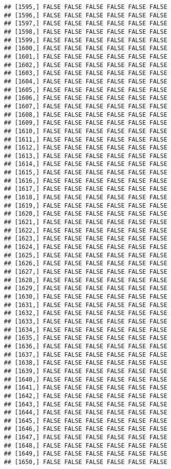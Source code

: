 \documentclass[
]{article}
\begin{document}
\begin{verbatim}
## [1595,] FALSE FALSE FALSE FALSE FALSE FALSE
## [1596,] FALSE FALSE FALSE FALSE FALSE FALSE
## [1597,] FALSE FALSE FALSE FALSE FALSE FALSE
## [1598,] FALSE FALSE FALSE FALSE FALSE FALSE
## [1599,] FALSE FALSE FALSE FALSE FALSE FALSE
## [1600,] FALSE FALSE FALSE FALSE FALSE FALSE
## [1601,] FALSE FALSE FALSE FALSE FALSE FALSE
## [1602,] FALSE FALSE FALSE FALSE FALSE FALSE
## [1603,] FALSE FALSE FALSE FALSE FALSE FALSE
## [1604,] FALSE FALSE FALSE FALSE FALSE FALSE
## [1605,] FALSE FALSE FALSE FALSE FALSE FALSE
## [1606,] FALSE FALSE FALSE FALSE FALSE FALSE
## [1607,] FALSE FALSE FALSE FALSE FALSE FALSE
## [1608,] FALSE FALSE FALSE FALSE FALSE FALSE
## [1609,] FALSE FALSE FALSE FALSE FALSE FALSE
## [1610,] FALSE FALSE FALSE FALSE FALSE FALSE
## [1611,] FALSE FALSE FALSE FALSE FALSE FALSE
## [1612,] FALSE FALSE FALSE FALSE FALSE FALSE
## [1613,] FALSE FALSE FALSE FALSE FALSE FALSE
## [1614,] FALSE FALSE FALSE FALSE FALSE FALSE
## [1615,] FALSE FALSE FALSE FALSE FALSE FALSE
## [1616,] FALSE FALSE FALSE FALSE FALSE FALSE
## [1617,] FALSE FALSE FALSE FALSE FALSE FALSE
## [1618,] FALSE FALSE FALSE FALSE FALSE FALSE
## [1619,] FALSE FALSE FALSE FALSE FALSE FALSE
## [1620,] FALSE FALSE FALSE FALSE FALSE FALSE
## [1621,] FALSE FALSE FALSE FALSE FALSE FALSE
## [1622,] FALSE FALSE FALSE FALSE FALSE FALSE
## [1623,] FALSE FALSE FALSE FALSE FALSE FALSE
## [1624,] FALSE FALSE FALSE FALSE FALSE FALSE
## [1625,] FALSE FALSE FALSE FALSE FALSE FALSE
## [1626,] FALSE FALSE FALSE FALSE FALSE FALSE
## [1627,] FALSE FALSE FALSE FALSE FALSE FALSE
## [1628,] FALSE FALSE FALSE FALSE FALSE FALSE
## [1629,] FALSE FALSE FALSE FALSE FALSE FALSE
## [1630,] FALSE FALSE FALSE FALSE FALSE FALSE
## [1631,] FALSE FALSE FALSE FALSE FALSE FALSE
## [1632,] FALSE FALSE FALSE FALSE FALSE FALSE
## [1633,] FALSE FALSE FALSE FALSE FALSE FALSE
## [1634,] FALSE FALSE FALSE FALSE FALSE FALSE
## [1635,] FALSE FALSE FALSE FALSE FALSE FALSE
## [1636,] FALSE FALSE FALSE FALSE FALSE FALSE
## [1637,] FALSE FALSE FALSE FALSE FALSE FALSE
## [1638,] FALSE FALSE FALSE FALSE FALSE FALSE
## [1639,] FALSE FALSE FALSE FALSE FALSE FALSE
## [1640,] FALSE FALSE FALSE FALSE FALSE FALSE
## [1641,] FALSE FALSE FALSE FALSE FALSE FALSE
## [1642,] FALSE FALSE FALSE FALSE FALSE FALSE
## [1643,] FALSE FALSE FALSE FALSE FALSE FALSE
## [1644,] FALSE FALSE FALSE FALSE FALSE FALSE
## [1645,] FALSE FALSE FALSE FALSE FALSE FALSE
## [1646,] FALSE FALSE FALSE FALSE FALSE FALSE
## [1647,] FALSE FALSE FALSE FALSE FALSE FALSE
## [1648,] FALSE FALSE FALSE FALSE FALSE FALSE
## [1649,] FALSE FALSE FALSE FALSE FALSE FALSE
## [1650,] FALSE FALSE FALSE FALSE FALSE FALSE

\end{verbatim}
\end{document}
